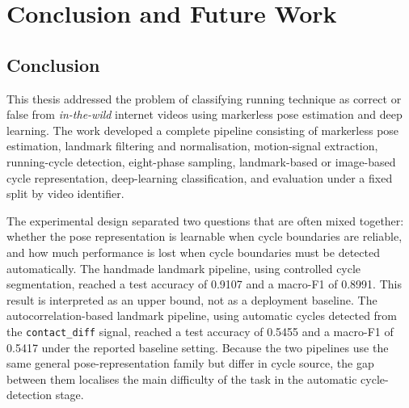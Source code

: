 %

\chapter{Conclusion and Future Work}
\label{ch:conclusion}

\section{Conclusion}
\label{sec:concl-summary}

This thesis addressed the problem of classifying running technique as correct or
false from \emph{in-the-wild} internet videos using markerless pose estimation
and deep learning. The work developed a complete pipeline consisting of
markerless pose estimation, landmark filtering and normalisation, motion-signal
extraction, running-cycle detection, eight-phase sampling, landmark-based or
image-based cycle representation, deep-learning classification, and evaluation
under a fixed split by video identifier.

The experimental design separated two questions that are often mixed together:
whether the pose representation is learnable when cycle boundaries are reliable,
and how much performance is lost when cycle boundaries must be detected
automatically. The handmade landmark pipeline, using controlled cycle
segmentation, reached a test accuracy of 0.9107 and a macro-F1 of 0.8991. This
result is interpreted as an upper bound, not as a deployment baseline. The
autocorrelation-based landmark pipeline, using automatic cycles detected from
the \texttt{contact\_diff} signal, reached a test accuracy of 0.5455 and a
macro-F1 of 0.5417 under the reported baseline setting. Because the two
pipelines use the same general pose-representation family but differ in cycle
source, the gap between them localises the main difficulty of the task in the
automatic cycle-detection stage.

